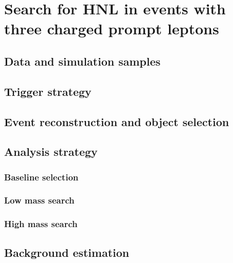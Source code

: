 
\chapter{Search for HNL in events with three charged prompt leptons} %

\label{Chapter4} %

\section{Data and simulation samples}

\section{Trigger strategy}
\section{Event reconstruction and object selection}
\section{Analysis strategy}
\subsection{Baseline selection}
\subsection{Low mass search}
\subsection{High mass search}

\section{Background estimation}
\subsection{}
\subsection{}
\subsection{}
